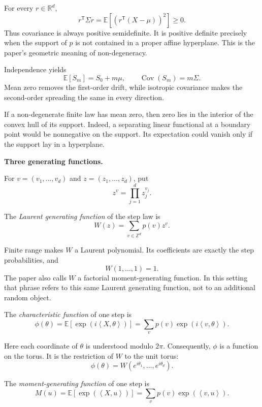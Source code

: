 For every $r\in\mathbb R^d$,
$$
r^{\mathsf T}\Sigma r
=\mathbb E[(r^{\mathsf T}(X-\mu))^2]
\geq 0.
$$
Thus covariance is always positive
semidefinite. It is positive definite
precisely when the support of $p$ is not
contained in a proper affine hyperplane.
This is the paper's geometric meaning of
non-degeneracy.

Independence yields
$$
\mathbb E[S_m]=S_0+m\mu,
\qquad
\operatorname{Cov}(S_m)=m\Sigma.
$$
Mean zero removes the first-order drift,
while isotropic covariance makes the
second-order spreading the same in every
direction.

If a non-degenerate finite law has mean
zero, then zero lies in the interior of
the convex hull of its support. Indeed, a
separating linear functional at a boundary
point would be nonnegative on the support.
Its expectation could vanish only if the
support lay in a hyperplane.

\medskip\noindent
{\bf Three generating functions.}

For $v=(v_1,\ldots,v_d)$ and
$z=(z_1,\ldots,z_d)$, put
$$
z^v=\prod_{j=1}^d z_j^{v_j}.
$$

\begin{definition}
\label{definition-laurent-step-function}
The \emph{Laurent generating function} of
the step law is
$$
W(z)=\sum_{v\in\mathbb Z^d}p(v)z^v.
$$
\end{definition}

Finite range makes $W$ a Laurent
polynomial. Its coefficients are exactly
the step probabilities, and
$$
W(1,\ldots,1)=1.
$$
The paper also calls $W$ a factorial
moment-generating function. In this setting
that phrase refers to this same Laurent
generating function, not to an additional
random object.

\begin{definition}
\label{definition-characteristic-function}
The \emph{characteristic function} of one
step is
$$
\phi(\theta)
=\mathbb E
 [\exp(i\left\langle{}
 X,\theta\right\rangle{})]
=\sum_v p(v)
 \exp(i\left\langle{}
 v,\theta\right\rangle{}).
$$
\end{definition}

Here each coordinate of $\theta$ is
understood modulo $2\pi$. Consequently,
$\phi$ is a function on the torus. It is
the restriction of $W$ to the unit torus:
$$
\phi(\theta)
=W(e^{i\theta_1},\ldots,e^{i\theta_d}).
$$

\begin{definition}
\label{definition-moment-generating-function}
The \emph{moment-generating function} of
one step is
$$
M(u)
=\mathbb E
 [\exp(\left\langle{}
 X,u\right\rangle{})]
=\sum_v p(v)
 \exp(\left\langle{}
 v,u\right\rangle{}).
$$
\end{definition}

